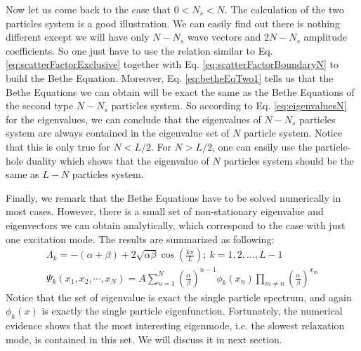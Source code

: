 Now let us come back to the case that $0<N_s<N$. The calculation of the two
particles system is a good illustration. We can easily find out there is
nothing different except we will have only $N-N_s$ wave vectors and $2N-N_s$
amplitude coefficients. So one just have to use the relation similar to Eq.
\eqref{eq:scatterFactorExclusive} together with Eq.
\eqref{eq:scatterFactorBoundaryN} to build the Bethe Equation. Moreover, Eq.
\eqref{eq:betheEqTwo1} tells us that the Bethe Equations we can obtain will be
exact the same as the Bethe Equations of the second type $N-N_s$ particles
system. So according to Eq. \eqref{eq:eigenvaluesN} for the eigenvalues, we can
conclude that the eigenvalues of $N-N_s$ particles system are always contained
in the eigenvalue set of $N$ particle system. Notice that this is only true for
$N<L/2$. For $N>L/2$, one can easily use the particle-hole duality which shows
that the eigenvalue of $N$ particles system should be the same as $L-N$
particles system.

Finally, we remark that the Bethe Equations have to be solved numerically in
most cases. However, there is a small set of non-stationary eigenvalue and
eigenvectors we can obtain analytically, which correspond to the case with
just one excitation mode. The results are summarized as following:  
\begin{subequations}
    \label{eq:eigenN}
    \begin{align}
        \label{eq:partEigenvaluesN}
        \Lambda_k  = 
        -(\alpha+\beta) + 2\sqrt{\alpha\beta}\cos(\frac{k\pi}{L});
        ~k=1,2,\dots, L-1  \\
        \label{eq:eigenvectorsN}
        \Psi_k(x_1, x_2, \cdots, x_N)  =  A \sum_{n=1}^N
        \left(\frac{\alpha}{\beta}\right)^{n-1} \phi_k(x_n)\prod_{m\neq n} 
         \left(\frac{\alpha}{\beta}\right)^{x_m}
    \end{align}
\end{subequations}
Notice that the set of eigenvalue is exact the single particle spectrum, and
again $\phi_k(x)$ is exactly the single particle eigenfunction.
Fortunately, the numerical evidence shows that the most interesting
eigenmode, i.e. the slowest relaxation mode, is contained in this set. 
We will discuss it in next section. 

